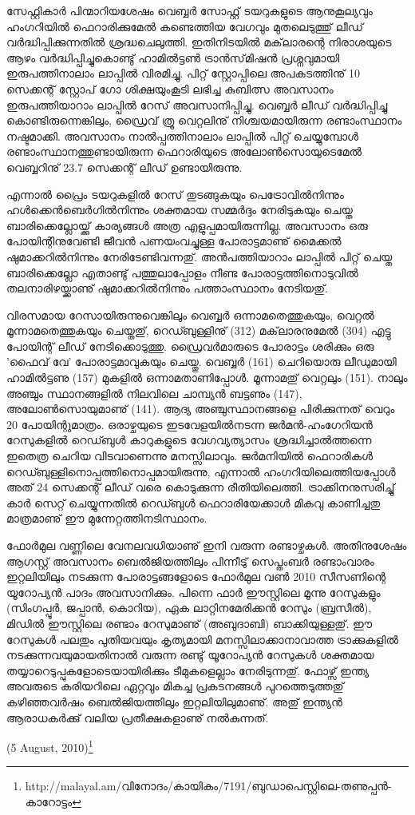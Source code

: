 സേഫ്റ്റികാര്‍ പിന്മാറിയശേഷം വെബ്ബര്‍ സോഫ്റ്റ് ടയറുകളുടെ ആനുകൂല്യവും ഹംഗറിയില്‍ ഫെറാരിക്കുമേല്‍ കണ്ടെത്തിയ 
വേഗവും മുതലെടുത്തു് ലീഡ് വര്‍ദ്ധിപ്പിക്കുന്നതില്‍ ശ്രദ്ധചെലുത്തി. ഇതിനിടയില്‍ മക്‌ലാരന്റെ നിരാശയുടെ ആഴം 
വര്‍ദ്ധിപ്പിച്ചുകൊണ്ടു് ഹാമില്‍ട്ടണ്‍ ട്രാന്‍സ്‌മിഷന്‍ പ്രശ്നവുമായി ഇരുപത്തിനാലാം ലാപ്പില്‍ വിരമിച്ചു. പിറ്റ് സ്റ്റോപ്പിലെ 
അപകടത്തിനു് 10 സെക്കന്റ് സ്റ്റോപ് ഗോ ശിക്ഷയുംകൂടി ലഭിച്ച കുബിത്സ അവസാനം ഇരുപത്തിയാറാം ലാപ്പില്‍ 
റേസ് അവസാനിപ്പിച്ചു. വെബ്ബര്‍ ലീഡ് വര്‍ദ്ധിപ്പിച്ചു കൊണ്ടിരുന്നെങ്കിലും, ഡ്രൈവ് ത്രൂ വെറ്റലിനു്
നിശ്ചയമായിരുന്ന രണ്ടാംസ്ഥാനം നഷ്ടമാക്കി. അവസാനം നാല്‍പ്പത്തിനാലാം ലാപ്പില്‍ പിറ്റ് ചെയ്യുമ്പോള്‍ രണ്ടാംസ്ഥാനത്തുണ്ടായിരുന്ന 
ഫെറാരിയുടെ അലോണ്‍സൊയുടെമേല്‍ വെബ്ബറിനു് 23.7 സെക്കന്റ് ലീഡ് ഉണ്ടായിരുന്നു.

എന്നാല്‍ പ്രൈം ടയറുകളില്‍ റേസ് തുടങ്ങുകയും പെട്രോവില്‍നിന്നും ഹള്‍ക്കെന്‍ബെര്‍ഗില്‍നിന്നും ശക്തമായ സമ്മര്‍ദ്ദം 
നേരിടുകയും ചെയ്ത ബാരിക്കെല്ലോയ്ക്കു് കാര്യങ്ങള്‍ അത്ര എളുപ്പമായിരുന്നില്ല. അവസാനം ഒരു പോയിന്റിനുവേണ്ടി ജീവന്‍ 
പണയംവച്ചുള്ള പോരാട്ടമാണു് മൈക്കല്‍ ഷുമാക്കറില്‍നിന്നും നേരിടേണ്ടിവന്നതു്. അന്‍പത്തിയാറാം ലാപ്പില്‍ പിറ്റ് 
ചെയ്ത ബാരിക്കെല്ലോ എതാണ്ടു് പത്തുലാപ്പോളം നീണ്ട പോരാട്ടത്തിനൊടുവില്‍ തലനാരിഴയ്ക്കാണു് ഷുമാക്കറില്‍നിന്നും 
പത്താംസ്ഥാനം നേടിയതു്.

വിരസമായ റേസായിരുന്നുവെങ്കിലും വെബ്ബര്‍ ഒന്നാമതെത്തുകയും, വെറ്റല്‍ മൂന്നാമതെത്തുകയും ചെയ്തതു്, റെഡ്ബുള്ളിനു് 
(312) മക്‌ലാരനുമേല്‍ (304) എട്ടു പോയിന്റ് ലീഡ് നേടിക്കൊടുത്തു. ഡ്രൈവര്‍മാരുടെ പോരാട്ടം ശരിക്കും ഒരു 'ഫൈവ് 
വേ' പോരാട്ടമാവുകയും ചെയ്തു. വെബ്ബര്‍ (161) ചെറിയൊരു ലീഡുമായി ഹാമില്‍ട്ടണു (157) മുകളില്‍ ഒന്നാമതാണിപ്പോള്‍. 
മൂന്നാമതു് വെറ്റലും (151). നാലും അഞ്ചും സ്ഥാനങ്ങളില്‍ നിലവിലെ ചാമ്പ്യന്‍ ബട്ടണും (147), 
അലോണ്‍സൊയുമാണു് (141). ആദ്യ അഞ്ചുസ്ഥാനങ്ങളെ പിരിക്കുന്നത് വെറും 20 പോയിന്റുമാത്രം. ഒരാഴ്ചയുടെ 
ഇടവേളയില്‍നടന്ന ജര്‍മന്‍-ഹംഗേറിയന്‍ റേസുകളില്‍ റെഡ്ബുള്‍ കാറുകളുടെ വേഗവ്യത്യാസം ശ്രദ്ധിച്ചാല്‍ത്തന്നെ 
ഇതെത്ര ചെറിയ വിടവാണെന്നു മനസ്സിലാവും. ജര്‍മനിയില്‍ ഫെറാരികള്‍ റെഡ്ബുള്ളിനൊപ്പത്തിനൊപ്പമായിരുന്നു, 
എന്നാല്‍ ഹംഗറിയിലെത്തിയപ്പോള്‍ അത് 24 സെക്കന്റ് ലീഡ് വരെ കൊടുക്കുന്ന രീതിയിലെത്തി. ട്രാക്കിനനുസരിച്ചു് 
കാര്‍ സെറ്റ് ചെയ്യുന്നതില്‍ റെഡ്ബുള്‍ ഫെറാരിയേക്കാള്‍ മികവു കാണിച്ചതു മാത്രമാണു് ഈ മുന്നേറ്റത്തിനടിസ്ഥാനം.

ഫോര്‍മുല വണ്ണിലെ വേനലവധിയാണു് ഇനി വരുന്ന രണ്ടാഴ്ചകള്‍. അതിനുശേഷം ആഗസ്റ്റ് അവസാനം 
ബെല്‍ജിയത്തിലും പിന്നീടു് സെപ്തംബര്‍ രണ്ടാംവാരം ഇറ്റലിയിലും നടക്കുന്ന പോരാട്ടങ്ങളോടെ ഫോര്‍മുല വണ്‍ 2010 
സീസണിന്റെ യൂറോപ്യന്‍ പാദം അവസാനിക്കും. പിന്നെ ഫാര്‍ ഈസ്റ്റിലെ മൂന്നു റേസുകളും (സിംഗപ്പൂര്‍, ജപ്പാന്‍, കൊറിയ),
ഏക ലാറ്റിനമേരിക്കന്‍ റേസും (ബ്രസീല്‍), മിഡില്‍ ഈസ്റ്റിലെ രണ്ടാം റേസുമാണു് (അബുദാബി) ബാക്കിയുള്ളതു്. ഈ 
റേസുകള്‍ പലതും പുതിയവയും കൃത്യമായി മനസ്സിലാക്കാനാവാത്ത ട്രാക്കുകളില്‍ നടക്കുന്നവയുമായതിനാല്‍ വരുന്ന രണ്ടു് 
യൂറോപ്യന്‍ റേസുകള്‍ ശക്തമായ തയ്യാറെടുപ്പുകളോടെയായിരിക്കും ടീമുകളെല്ലാം നേരിടുന്നതു്. ഫോഴ്സ് ഇന്ത്യ അവരുടെ 
കരിയറിലെ ഏറ്റവും മികച്ച പ്രകടനങ്ങള്‍ പുറത്തെടുത്തതു് കഴിഞ്ഞവര്‍ഷം ബെല്‍ജിയത്തിലും ഇറ്റലിയിലുമാണു്. 
അതു് ഇന്ത്യന്‍ ആരാധകര്‍ക്കു് വലിയ പ്രതീക്ഷകളാണു് നല്‍കുന്നത്.

\hspace*{2em}(5 August, 2010)\footnote{http://malayal.am/വിനോദം/കായികം/7191/ബുഡാപെസ്റ്റിലെ-തണുപ്പന്‍-കാറോട്ടം}

\newpage
